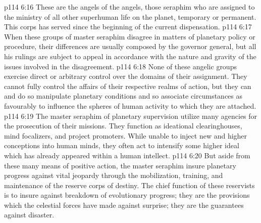 \vs p114 6:16 \bibnobreakspace {} These are the angels of the angels, those seraphim who are assigned to the ministry of all other superhuman life on the planet, temporary or permanent. This corps has served since the beginning of the current dispensation.
\vs p114 6:17 \pc When these groups of master seraphim disagree in matters of planetary policy or procedure, their differences are usually composed by the governor general, but all his rulings are subject to appeal in accordance with the nature and gravity of the issues involved in the disagreement.
\vs p114 6:18 None of these angelic groups exercise direct or arbitrary control over the domains of their assignment. They cannot fully control the affairs of their respective realms of action, but they can and do so manipulate planetary conditions and so associate circumstances as favourably to influence the spheres of human activity to which they are attached.
\vs p114 6:19 The master seraphim of planetary supervision utilize many agencies for the prosecution of their missions. They function as ideational clearinghouses, mind focalizers, and project promoters. While unable to inject new and higher conceptions into human minds, they often act to intensify some higher ideal which has already appeared within a human intellect.
\vs p114 6:20 But aside from these many means of positive action, the master seraphim insure planetary progress against vital jeopardy through the mobilization, training, and maintenance of the reserve corps of destiny. The chief function of these reservists is to insure against breakdown of evolutionary progress; they are the provisions which the celestial forces have made against surprise; they are the guarantees against disaster.
